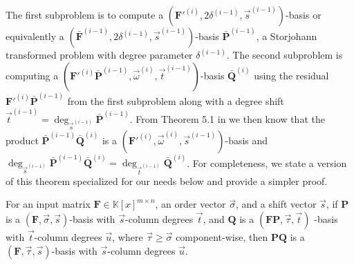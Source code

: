The first subproblem is to compute a $(\mathbf{F}'^{\left(i\right)},2\delta^{\left(i-1\right)},\vec{s}^{\left(i-1\right)})$-basis
or equivalently a $(\bar{\mathbf{F}}^{\left(i-1\right)},2\delta^{\left(i-1\right)},\vec{s}^{\left(i-1\right)})$-basis
$\bar{\mathbf{P}}^{\left(i-1\right)}$, a Storjohann transformed problem
with degree parameter $\delta^{\left(i-1\right)}$. The second subproblem
is computing a $(\mathbf{F}'^{\left(i\right)}\bar{\mathbf{P}}^{\left(i-1\right)},\vec{\omega}^{\left(i\right)},\vec{t}^{\left(i-1\right)})$-basis
$\bar{\mathbf{Q}}^{\left(i\right)}$ using the residual $\mathbf{F}'^{\left(i\right)}\bar{\mathbf{P}}^{\left(i-1\right)}$
from the first subproblem along with a degree shift $\vec{t}^{\left(i-1\right)}=\deg_{\vec{s}^{\left(i-1\right)}}\bar{\mathbf{P}}^{\left(i-1\right)}$.
From Theorem 5.1 in \citep{BL1997} we then know that the product
$\bar{\mathbf{P}}^{\left(i-1\right)}\bar{\mathbf{Q}}^{\left(i\right)}$
is a $(\mathbf{F}'^{\left(i\right)},\vec{\omega}^{\left(i\right)},\vec{s}^{\left(i-1\right)})$-basis
and $\deg_{\vec{s}^{\left(i-1\right)}}\bar{\mathbf{P}}^{\left(i-1\right)}\bar{\mathbf{Q}}^{\left(i\right)}=\deg_{\vec{t}^{\left(i-1\right)}}\bar{\mathbf{Q}}^{\left(i\right)}$.
For completeness, we state a version of this theorem specialized for
our needs below and provide a simpler proof.
\begin{thm}
\label{thm:combineOrderBases}For an input matrix $\mathbf{F}\in\mathbb{K}\left[x\right]^{m\times n}$,
an order vector $\vec{\sigma}$, and a shift vector $\vec{s}$, if
$\mathbf{P}$ is a $\left(\mathbf{F},\vec{\sigma},\vec{s}\right)$-basis
with $\vec{s}$-column degrees $\vec{t}$, and $\mathbf{Q}$ is a
$(\mathbf{F}\mathbf{P},\vec{\tau},\vec{t})$ -basis with $\vec{t}$-column
degrees $\vec{u}$, where $\vec{\tau}\ge\vec{\sigma}$ component-wise,
then $\mathbf{P}\mathbf{Q}$ is a $(\mathbf{F},\vec{\tau},\vec{s})$-basis
with $\vec{s}$-column degrees $\vec{u}$.\end{thm}
